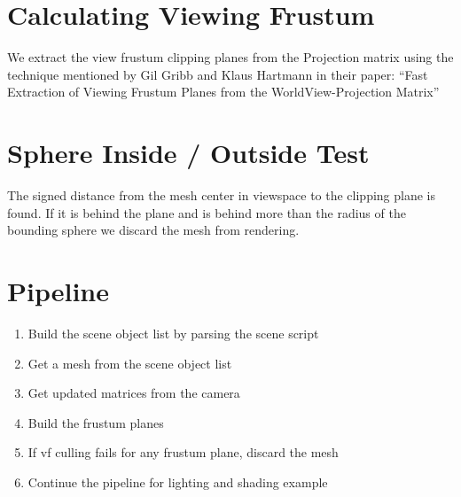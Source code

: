 \section{Calculating Viewing Frustum}
We extract the view frustum clipping planes from the Projection matrix using the technique mentioned by Gil Gribb and Klaus Hartmann in their paper: ``Fast Extraction of Viewing Frustum Planes from the WorldView-Projection Matrix''
\section{Sphere Inside / Outside Test}
The signed distance from the mesh center in viewspace to the clipping plane is found. If it is behind the plane and is behind more than the radius of the bounding sphere we discard the mesh from rendering.
\section{Pipeline}
\begin{enumerate}
    \item Build the scene object list by parsing the scene script
    \item Get a mesh from the scene object list
    \item Get updated matrices from the camera
	\item Build the frustum planes
	\item If vf culling fails for any frustum plane, discard the mesh 
    \item Continue the pipeline for lighting and shading example
\end{enumerate}
\clearpage